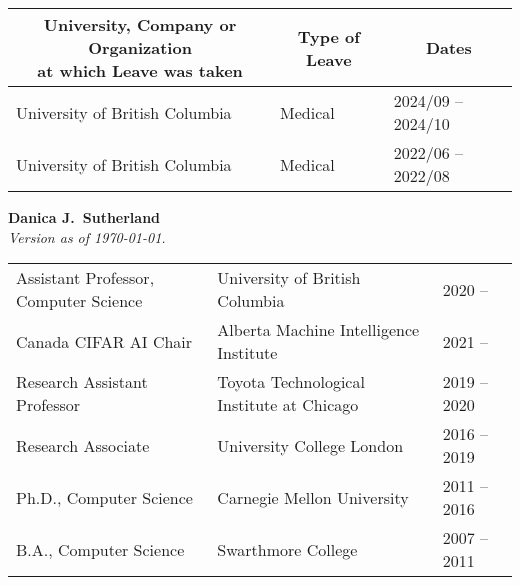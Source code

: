 \documentclass[10pt]{article}
\begin{document}
{%
%

{%
  \noindent\vspace{-2em}
  \begin{table}[h!]
    \begin{tabular}{ p{} p{} p{} }
      \toprule
      \multicolumn{1}{c}{\parbox[c][][c]{0.45\textwidth}{\centering\bf University, Company or Organization \\ at which Leave was taken}} &
      \multicolumn{1}{c}{\bf Type of Leave}
      & \multicolumn{1}{c}{\bf Dates} \\
      \midrule
      University of British Columbia &  Medical & 2024/09 -- 2024/10 \\
      University of British Columbia &  Medical & 2022/06 -- 2022/08 \\
      \bottomrule
    \end{tabular}
  \end{table}

  \clearpage
}%

}{
    \begin{center}
    \textbf{\Large Danica J.\ Sutherland}
    \\
    \footnotesize{\textit{Version as of \today.}}
    \end{center}

\begin{table}[h!]
  \begin{tabular}{ p{} p{} p{} }
    \toprule
    Assistant Professor, Computer Science & University of British Columbia  & 2020 --         \\
    Canada CIFAR AI Chair & Alberta Machine Intelligence Institute & 2021 --  \\
    \midrule
    Research Assistant Professor & Toyota Technological Institute at Chicago & 2019 -- 2020 \\
    Research Associate & University College London & 2016 -- 2019 \\
    Ph.D., Computer Science & Carnegie Mellon University & 2011 -- 2016 \\
    B.A., Computer Science & Swarthmore College & 2007 -- 2011 \\
    \bottomrule
  \end{tabular}
\end{table}
}
\end{document}
